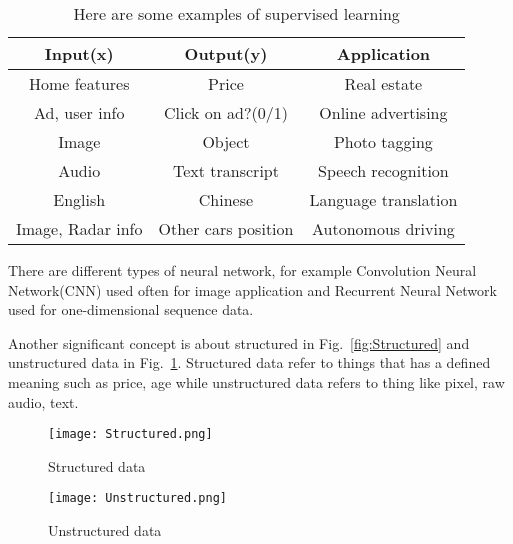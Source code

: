 \documentclass[10pt,twocolumn,letterpaper]{article}
\begin{document}
\begin{table}[H]
\begin{center}
\caption{Here are some examples of supervised learning}
\begin{tabular}{ccc}
\toprule
Input(x) & Output(y) & Application \\
\midrule
Home features & Price & Real estate \\
Ad, user info & Click on ad?(0/1) & Online advertising \\
Image & Object & Photo tagging \\
Audio & Text transcript & Speech recognition \\
English & Chinese & Language translation \\
Image, Radar info & Other cars position & Autonomous driving \\
\bottomrule
\end{tabular}
\label{Tab:Examples }
\end{center}
\end{table}

There are different types of neural network, for example Convolution Neural Network(CNN) used often for image application and Recurrent Neural Network used for one-dimensional sequence data.\par
Another significant concept is about structured in Fig.~\ref{fig:Structured} and unstructured data in Fig.~\ref{fig:Unstructured}. Structured data refer to things that has a defined meaning such as price, age while unstructured data refers to thing like pixel, raw audio, text.\par


\begin{figure}
\begin{minipage}[t]{0.5\linewidth}
\centering
\texttt{[image: Structured.png]}
\caption{Structured data}
\label{fig:Structured}
\end{minipage}%
\begin{minipage}[t]{0.5\linewidth}
\centering
\texttt{[image: Unstructured.png]}
\caption{Unstructured data}
\label{fig:Unstructured}
\end{minipage}
\end{figure}


%
%
\end{document}
